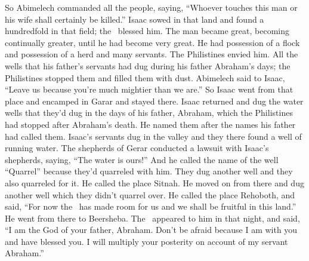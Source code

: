 \begin{inparaenum}
   So Abimelech commanded all the people, saying, ``Whoever touches this man or his wife shall certainly be killed.''%
   Isaac sowed in that land and found a hundredfold in that field; the \lord\ blessed him.%
   The man became great, becoming continually greater, until he had become very great.%
   He had possession of a flock and possession of a herd and many servants. The Philistines envied him.%
   All the wells that his father's servants had dug during his father Abraham's days; the Philistines stopped them and filled them with dust.%
   Abimelech said to Isaac, ``Leave us because you're much mightier than we are.''%
   So Isaac went from that place and encamped in Garar and stayed there.%
   Isaac returned and dug the water wells that they'd dug in the days of his father, Abraham, which the Philistines had stopped after Abraham's death. He named them after the names his father had called them.%
   Isaac's servants dug in the valley and they there found a well of running water.%
   The shepherds of Gerar conducted a lawsuit with Isaac's shepherds, saying, ``The water is ours!'' And he called the name of the well ``Quarrel'' because they'd quarreled with him.%
   They dug another well and they also quarreled for it. He called the place Sitnah.%
   He moved on from there and dug another well which they didn't quarrel over. He called the place Rehoboth, and said, ``For now the \lord\ has made room for us and we shall be fruitful in this land.''%
   He went from there to Beersheba.%
   The \lord\ appeared to him in that night, and said, ``I am the God of your father, Abraham. Don't be afraid because I am with you and have blessed you. I will multiply your posterity on account of my servant Abraham.''%

\end{inparaenum}
